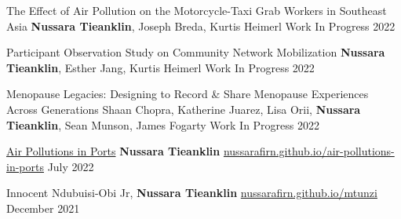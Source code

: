 

\begin{cventries}

\cvpub
    {The Effect of Air Pollution on the Motorcycle-Taxi Grab Workers in Southeast Asia} %
    {\textbf{Nussara Tieanklin}, Joseph Breda, Kurtis Heimerl} %
    {Work In Progress} %
    {2022} %


\cvpub
    {Participant Observation Study on Community Network Mobilization} %
    {\textbf{Nussara Tieanklin}, Esther Jang, Kurtis Heimerl} %
    {Work In Progress} %
    {2022} %
   
   

\cvpub
    {Menopause Legacies: Designing to Record \& Share Menopause Experiences Across Generations} %
    {Shaan Chopra, Katherine Juarez, Lisa Orii, \textbf{Nussara Tieanklin}, Sean Munson, James Fogarty} %
    {Work In Progress} %
    {2022} %
   


\cvpub
      { \href{https://nussarafirn.github.io/air-pollutions-in-ports}{Air Pollutions in Ports}} %
    {\textbf{Nussara Tieanklin}} %
    { \href{https://nussarafirn.github.io/air-pollutions-in-ports}{nussarafirn.github.io/air-pollutions-in-ports}} %
    {July 2022} %

\cvpub
    {} %
    {Innocent Ndubuisi-Obi Jr, \textbf{Nussara Tieanklin}} %
    { \href{https://nussarafirn.github.io/mtunzi}{nussarafirn.github.io/mtunzi}} %
    {December 2021} %


\end{cventries}
